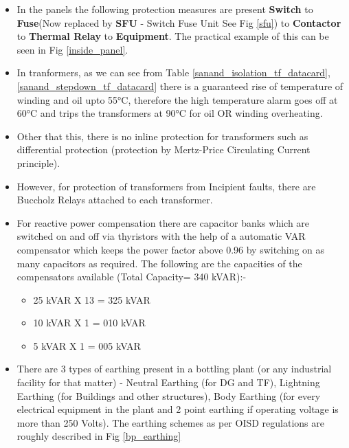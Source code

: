 \documentclass{report}
\begin{document}
	\begin{itemize}
		\item In the panels the following protection measures are present \textbf{Switch} to \textbf{Fuse}(Now replaced by \textbf{SFU} - Switch Fuse Unit See Fig \ref{sfu}) to \textbf{Contactor} to \textbf{Thermal Relay} to \textbf{Equipment}. The practical example of this can be seen in Fig \ref{inside_panel}.
		\item In tranformers, as we can see from Table \ref{sanand_isolation_tf_datacard}, \ref{sanand_stepdown_tf_datacard} there is a guaranteed rise of temperature of winding and oil upto \ang{55}C, therefore the high temperature alarm goes off at \ang{60}C and trips the transformers at \ang{90}C for oil OR winding overheating.
		\item Other that this, there is no inline protection for transformers such as differential protection (protection by Mertz-Price Circulating Current principle).
		\item However, for protection of transformers from Incipient faults, there are Buccholz Relays attached to each transformer. 
		\item For reactive power compensation there are capacitor banks which are switched on and off via thyristors with the help of a automatic VAR compensator which keeps the power factor above 0.96 by switching on as many capacitors as required. The following are the capacities of the compensators available (Total Capacity= 340 kVAR):-
		\begin{itemize}
			\item 25 kVAR X 13 = 325 kVAR
			\item 10 kVAR X 1  = 010 kVAR
			\item 5 kVAR X 1 =   005 kVAR
		\end{itemize}
		\item There are 3 types of earthing present in a bottling plant (or any industrial facility for that matter) - Neutral Earthing (for DG and TF), Lightning Earthing (for Buildings and other structures), Body Earthing (for every electrical equipment in the plant and 2 point earthing if operating voltage is more than 250 Volts). The earthing schemes as per OISD regulations are roughly described in Fig \ref{bp_earthing}
	\end{itemize}
	
	
\end{document}
